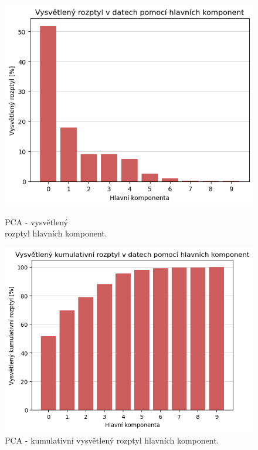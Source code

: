 \begin{figure}[hbtp!]
    \centering
    \begin{minipage}[t]{.5\textwidth}
      \centering
      \captionsetup{justification=centering}

      \includegraphics[width=\textwidth]{obrazky/zntb/pca-roztyl_komponetn.png}
      \caption{PCA - vysvětlený \\ rozptyl hlavních komponent.}
      \label{obr:nb:pca_roztyl_komponetn}
    \end{minipage}%
    \begin{minipage}[t]{.5\textwidth}
      \centering
      \captionsetup{justification=centering}

      \includegraphics[width=\textwidth]{obrazky/zntb/pca-kum_roztyl_komponetn.png}
      \caption{PCA - kumulativní vysvětlený rozptyl hlavních komponent.}
      \label{obr:nb:pca_kum_roztyl_komponetn}
    \end{minipage}
    \end{figure}

